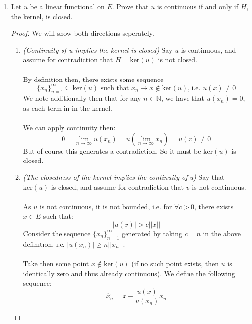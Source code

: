 \documentclass[12pt]{article}
\newenvironment{ex}[2][Exercise]{\begin{trivlist}
\item[\hskip \labelsep {\bfseries #1}\hskip \labelsep {\bfseries #2.}]}{\end{trivlist}}
\begin{document}
\begin{ex}{2}
\begin{enumerate}[label=(\alph*)]
\begin{proof}
\begin{enumerate}[label=(\arabic*)]
            \end{enumerate}
        \end{proof}
        \item Let $u$ be a linear functional on $E$. Prove that $u$ is continuous if and only if $H$, the kernel, is closed.
        \begin{proof}
            We will show both directions seperately.
            \begin{enumerate}[label=(\arabic*)]
                \item \textit{(Continuity of u implies the kernel is closed)} Say $u$ is continuous, and assume for contradiction that $H = \text{ker}(u)$ is not closed. \\ \\
                By definition then, there exists some sequence $$\{x_n\}_{n = 1}^\infty \subseteq \text{ker}(u) \text{ such that } x_n \rightarrow x \notin \text{ker}(u)\text{, i.e. } u(x) \neq 0$$ We note additionally then that for any $n \in \mathbb{N}$, we have that $u(x_n) = 0$, as each term in in the kernel.
                \\ \\
                We can apply continuity then:
                \begin{equation}
                    0 = \underset{n \rightarrow \infty}{\lim} u(x_n) = u(\underset{n \rightarrow \infty}{\lim} x_n) = u(x) \neq 0
                \end{equation}
                But of course this generates a contradiction. So it must be $\text{ker}(u)$ is closed.
                \item \textit{(The closedness of the kernel implies the continuity of u)} Say that $\text{ker}(u)$ is closed, and assume for contradiction that $u$ is not continuous. \\ \\
                As $u$ is not continuous, it is not bounded, i.e. for $\forall c > 0$, there exists $x \in E$ such that:
                $$|u(x)| > c||x||$$
                Consider the sequence $\{x_n\}_{n = 1}^\infty$ generated by taking $c = n$ in the above definition, i.e. $|u(x_n)| \geq n||x_n||$. \\ \\Take then some point $x \notin \text{ker}(u)$ (if no such point exists, then $u$ is identically zero and thus already continuous). We define the following sequence:
                \begin{equation}
                    \hat{x}_n = x - \frac{u(x)}{u(x_n)}x_n

\end{equation}
\end{enumerate}
\end{proof}
\end{enumerate}
\end{ex}
\end{document}
